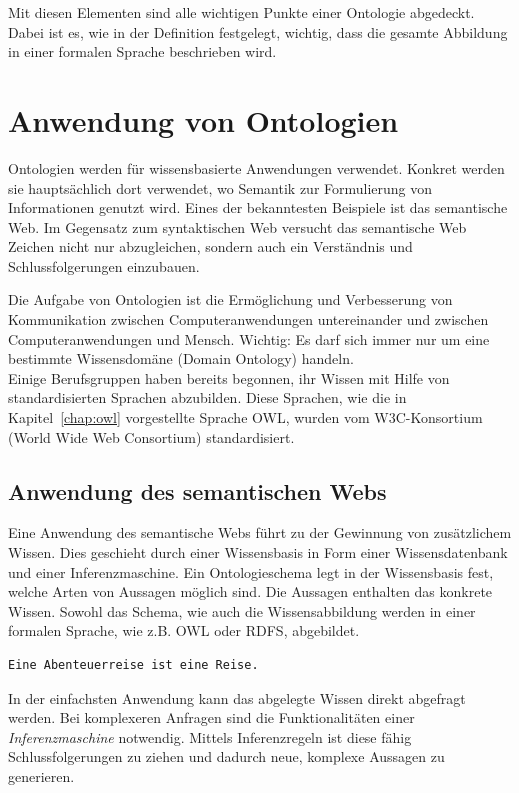 Mit diesen Elementen sind alle wichtigen Punkte einer Ontologie abgedeckt. Dabei ist es, wie in der Definition festgelegt, wichtig, dass die gesamte Abbildung in einer formalen Sprache beschrieben wird.

\section{Anwendung von Ontologien}
\label{sec:ontologien_onto_anwendung}
Ontologien werden für wissensbasierte Anwendungen verwendet. Konkret werden sie hauptsächlich dort verwendet, wo Semantik zur Formulierung von Informationen genutzt wird. Eines der bekanntesten Beispiele ist das semantische Web. Im Gegensatz zum syntaktischen Web versucht das semantische Web Zeichen nicht nur abzugleichen, sondern auch ein Verständnis und Schlussfolgerungen einzubauen.

Die Aufgabe von Ontologien ist die Ermöglichung und Verbesserung von Kommunikation zwischen Computeranwendungen untereinander und zwischen Computeranwendungen und Mensch. Wichtig: Es darf sich immer nur um eine bestimmte Wissensdomäne (Domain Ontology) handeln.\\
Einige Berufsgruppen haben bereits begonnen, ihr Wissen mit Hilfe von standardisierten Sprachen abzubilden. Diese Sprachen, wie die in Kapitel~\ref{chap:owl} vorgestellte Sprache OWL, wurden vom W3C-Konsortium (World Wide Web Consortium) standardisiert.

\subsection{Anwendung des semantischen Webs}
\label{subsec:ontologien_onto_SemantikWebAnwendung}
Eine Anwendung des semantische Webs führt zu der Gewinnung von zusätzlichem Wissen. Dies geschieht durch einer Wissensbasis in Form einer Wissensdatenbank und einer Inferenzmaschine. Ein Ontologieschema legt in der Wissensbasis fest, welche Arten von Aussagen möglich sind. Die Aussagen enthalten das konkrete Wissen. Sowohl das Schema, wie auch die Wissensabbildung werden in einer formalen Sprache, wie z.B. OWL oder RDFS, abgebildet.

\begin{lstlisting}[caption={Beispiel einer Aussage in einer Wissensbasis.}]
Eine Abenteuerreise ist eine Reise.
\end{lstlisting}

In der einfachsten Anwendung kann das abgelegte Wissen direkt abgefragt werden. Bei komplexeren Anfragen sind die Funktionalitäten einer \textit{Inferenzmaschine} notwendig. Mittels Inferenzregeln ist diese fähig Schlussfolgerungen zu ziehen und dadurch neue, komplexe Aussagen zu generieren.

